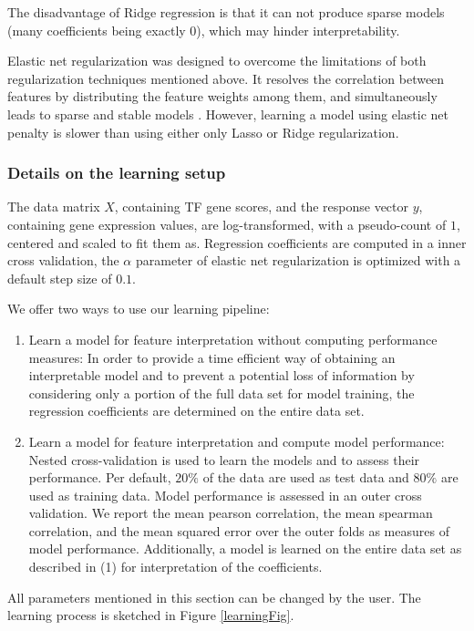 \documentclass{article}
\begin{document}
The disadvantage of Ridge regression is that it can not produce sparse models (many coefficients being exactly 0), which may hinder interpretability. 

Elastic net regularization was designed to overcome the limitations of both regularization techniques mentioned above.
It resolves the correlation between features by distributing the feature weights among them, and simultaneously leads to sparse and stable models \cite{Zou05regularizationand}. 
However, learning a model using elastic net penalty is slower than using either only Lasso or Ridge regularization.

\subsubsection*{Details on the learning setup}
The data matrix $X$, containing TF gene scores, and the response vector $y$, containing gene expression values, are log-transformed, 
with a pseudo-count of $1$, centered and scaled to fit them as. 
Regression coefficients are computed in a inner cross validation,
the $\alpha$ parameter of elastic net regularization is optimized with a default step size of $0.1$.

We offer two ways to use our learning pipeline:
\begin{enumerate}
\item{Learn a model for feature interpretation without computing performance measures:
In order to provide a time efficient way of obtaining an interpretable model and to prevent a potential loss of information
by considering only a portion of the full data set for model training, the regression coefficients are determined on the entire data set.}
\item{Learn a model for feature interpretation and compute model performance: 
Nested cross-validation is used to learn the models and to assess their performance. 
Per default, $20\%$ of the data are used as test data and $80\%$ are used as training data. 
Model performance is assessed in an outer cross validation. 
We report the mean pearson correlation, the mean spearman correlation, and the mean squared error over the outer folds as measures of model performance.
Additionally, a model is learned on the entire data set as described in (1) for interpretation of the coefficients.}
\end{enumerate}
All parameters mentioned in this section can be changed by the user. The learning process is sketched in Figure \ref{learningFig}.
\end{document}
